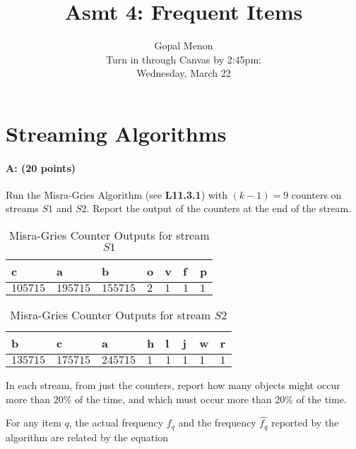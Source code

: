 \documentclass[11pt]{article}
\title{Asmt 4: Frequent Items}
\author{Gopal Menon\\Turn in through Canvas by 2:45pm: \\
Wednesday, March 22}
\date{}
\begin{document}
\maketitle



\section{Streaming Algorithms}

\paragraph{A: (20 points)} 
Run the Misra-Gries Algorithm (see \textbf{L11.3.1}) with $(k - 1) = 9$ counters on streams $S1$ and $S2$. Report the output of the counters at the end of the stream.


    \begin{table}[!h] 
    \centering
    \caption{Misra-Gries Counter Outputs for stream $S1$}
    \label{S1Misra}
    \begin{tabular}{K{1.5cm}K{1.5cm}K{1.5cm}K{1.5cm}K{1.5cm}K{1.5cm}K{1.5cm}}
      \hline
   c  & a &  b & o & v & f & p  \\
      \hline      
      $105715$ &   $195715$              &  $155715$  &          $2$             & $1$      & $1$    & $1$           \\
      \hline      
    \end{tabular}
    \end{table}

    \begin{table}[!h] 
    \centering
    \caption{Misra-Gries Counter Outputs for stream $S2$}
    \label{S2Misra}
    \begin{tabular}{K{1.5cm}K{1.5cm}K{1.5cm}K{1.5cm}K{1.5cm}K{1.5cm}K{1.5cm}K{1.5cm}}
      \hline
   b  & c &  a & h & l & j & w & r  \\
      \hline      
      $135715$ &   $175715$              &  $245715$  &          $1$             & $1$      & $1$    & $1$    & $1$       \\
      \hline      
    \end{tabular}
    \end{table}

In each stream, from just the counters, report how many objects might occur more than 20\% of the time, and which must occur more than 20\% of the time. 

For any item $q$, the actual frequency $f_q$ and the frequency $\hat{f_q}$ reported by the algorithm are related by the equation
\end{document}
